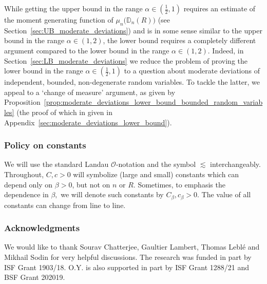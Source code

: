 \documentclass[11pt]{amsart}
\theoremstyle{definition}
\theoremstyle{remark}
\numberwithin{equation}{section}
\newcommand{\bD}{\mathbb D}
\begin{document}
	While getting the upper bound in the range $\alpha\in(\tfrac{1}{2},1)$ requires an estimate of the moment generating function of $\mu_n\big(\bD_n(R)\big)$ (see Section~\ref{sec:UB_moderate_deviations}) and is in some sense similar to the upper bound in the range $\alpha\in(1,2)$, the lower bound requires a completely different argument compared to the lower bound in the range $\alpha\in(1,2)$. Indeed, in Section~\ref{sec:LB_moderate_deviations} we reduce the problem of proving the lower bound in the range $\alpha\in(\tfrac{1}{2},1)$ to a question about moderate deviations of independent, bounded, non-degenerate random variables. To tackle the latter, we appeal to a `change of measure' argument, as given by Proposition~\ref{prop:moderate_deviations_lower_bound_bounded_random_variables} (the proof of which in given in Appendix~\ref{sec:moderate_deviations_lower_bound}). 
	
	\subsubsection*{Policy on constants}
	We will use the standard Landau $\mathcal{O}$-notation and the symbol $\lesssim$ interchangeably. Throughout, $C,c>0$ will symbolize (large and small) constants which can depend only on $\beta>0$, but not on $n$ or $R$. Sometimes, to emphasis the dependence in $\beta,$ we will denote such constants by $C_\beta,c_\beta>0$. The value of all constants can change from line to line.
	\subsubsection*{Acknowledgments}
	We would like to thank Sourav Chatterjee, Gaultier Lambert, Thomas Lebl\'e and Mikhail Sodin for very helpful discussions. The research was funded in part by ISF Grant 1903/18. O.Y. is also supported in part by ISF Grant 1288/21 and BSF Grant 202019.
\end{document}
